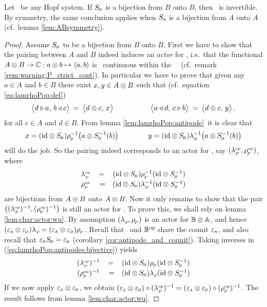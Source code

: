 \begin{lemma_sec} \label{lem:bijective_S_implies_ABop_invertible}
Let\/ \pairAB\ be any Hopf system.
If\/ $S_{\scriptscriptstyle \! B}$ is a bijection from\/ $B$ onto\/ $B$, then \pairABop\ is invertible.
By symmetry, the same conclusion applies when\/ $S_{\scriptscriptstyle \! A}$ is a bijection from\/
$A$ onto\/ $A$
(cf.\ lemma \ref{lem:ABsymmetry}).
\end{lemma_sec}
\begin{proof}
Assume $S_{\scriptscriptstyle \! B}$ to be a bijection from $B$ onto $B$.
First we have to show that the pairing between $A$ and $B$
indeed induces an {\em actor\/} for \BBopAA, i.e.\ that the functional
$A \otimes B \rightarrow \mathbb{C} : a \otimes b \mapsto \langle a,b \rangle$
is \stricta\ continuous within the \context\ \BBopAA\
(cf.\ remark \ref{rem:warning:P_strict_cont}).
In particular we have to prove that given any $a \in A$ and $b \in B$
there exist $x,y \in A \otimes B$ such that
(cf.\ equation \ref{eq:lamrhoPop:def})
$$  \pairM{d \lact a}{b \ract c}    \:=\:   \pairM{d \tens c}{x}
           \hspace{5em}
    \pairM{a \ract d}{c \lact b}    \:=\:   \pairM{d \tens c}{y}.     $$
for all $c \in A$ and $d \in B$.
From lemma \ref{lem:lamrhoPop:antipode}\ it is clear that
$$  x = (\id \tens \SB)\rp^{-1} \! \left(a \tens \SB^{-1}(b) \vertM\right)
      \hspace{4em}
    y = (\id \tens \SB)\lp^{-1} \! \left(a \tens \SB^{-1}(b) \vertM\right)  $$
will do the job.
So the pairing indeed corresponds to an actor for \BBopAA,
say $(\lambda^{\scriptscriptstyle \rm op}_{_P\!},\rho^{\scriptscriptstyle \rm op}_{_{\!P}})$, where
\begin{equation} \label{eq:lamrhoPop:antipodes:bijective}
\begin{array}{ccc}
   \lpop &=& (\id \tens \SB)\rp^{-1} (\id \tens \SB^{-1})
   \\
   \rpop &\vertL=& (\id \tens \SB)\lp^{-1} (\id \tens \SB^{-1})
\end{array}
\end{equation}
are bijections from $A \otimes B$ onto $A \otimes B$.
Now it only remains to show that the pair $\left((\lpop)^{-1}, (\rpop)^{-1} \vertM\right)$
is still an actor for \BBopAA\@.
To prove this, we shall rely on lemma \ref{lem:char:actor:wu}\@.
By assumption $(\lambda_{_P\!},\rho_{_{\!P}})$ is an actor for $\mathbb{B} \otimes \mathbb{A}$,
and hence $(\varepsilon_{\scriptscriptstyle \! A} \otimes \varepsilon_{\scriptscriptstyle \! B}) \lambda_{_P\!} = (\varepsilon_{\scriptscriptstyle \! A} \otimes \varepsilon_{\scriptscriptstyle \! B}) \rho_{_{\!P}}$.
Recall that \BB\ and $\mathbb{B}^{\hspace{0.5pt}\rm op\!}$ share the counit $\varepsilon_{\scriptscriptstyle \! A}$,
and also recall that $\varepsilon_{\scriptscriptstyle \! B} S_{\scriptscriptstyle \! B} = \varepsilon_{\scriptscriptstyle \! B}$ (corollary \ref{cor:antipode_and_counit}).
Taking inverses in (\ref{eq:lamrhoPop:antipodes:bijective}) yields
\begin{equation}\label{eq:lamrhoPop:antipodes:bijective:bis}
\begin{array}{ccc}
   (\lpop)^{-1} &=& (\id \tens \SB)\rp (\id \tens \SB^{-1})
\\
   (\rpop)^{-1} &\vertL=& (\id \tens \SB)\lp (\id \tens \SB^{-1})
\end{array}
\end{equation}
If we now apply $\varepsilon_{\scriptscriptstyle \! A} \otimes \varepsilon_{\scriptscriptstyle \! B}$, we obtain
$(\varepsilon_{\scriptscriptstyle \! A} \otimes \varepsilon_{\scriptscriptstyle \! B}) \circ (\lambda^{\scriptscriptstyle \rm op}_{_P\!})^{-1}  =  (\varepsilon_{\scriptscriptstyle \! A} \otimes \varepsilon_{\scriptscriptstyle \! B}) \circ (\rho^{\scriptscriptstyle \rm op}_{_{\!P}})^{-1}$.
The result follows from lemma \ref{lem:char:actor:wu}\@.
\end{proof}



